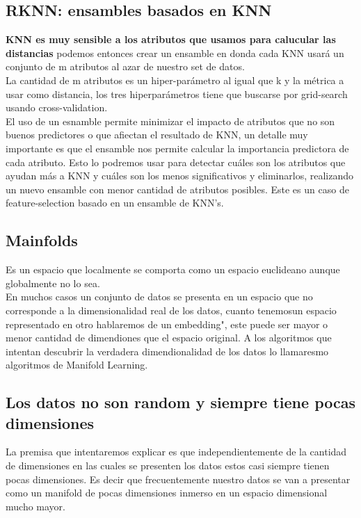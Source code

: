 \documentclass[titlepage,a4paper]{article}
\begin{document}
\subsection*{RKNN: ensambles basados en KNN}
\textbf{KNN es muy sensible a los atributos que usamos para calucular las distancias} podemos entonces crear un ensamble en donda cada KNN usará un conjunto de m atributos al azar de nuestro set de datos. \\
La cantidad de m atributos es un hiper-parámetro al igual que k y la métrica a usar como distancia, los tres hiperparámetros tiene que buscarse  por grid-search usando cross-validation. \\

El uso de un esnamble permite minimizar el impacto de atributos que no son buenos predictores o que afiectan el resultado de KNN, un detalle muy importante es que el ensamble nos permite calcular la importancia predictora de cada atributo. Esto lo podremos usar para detectar cuáles son los atributos que ayudan más a KNN y cuáles son los menos significativos y eliminarlos, realizando un nuevo ensamble con menor cantidad de atributos posibles. Este es un caso de feature-selection basado en un ensamble de KNN's. 

\subsection*{Mainfolds}
Es un espacio que localmente se comporta como un espacio euclideano aunque globalmente no lo sea. \\

En muchos casos un conjunto de datos se presenta en un espacio que no corresponde a la dimensionalidad real de los datos, cuanto tenemosun espacio representado en otro hablaremos de un embedding", este puede ser mayor o menor cantidad de dimendiones que el espacio original. A los algoritmos que intentan descubrir la verdadera dimendionalidad de los datos lo llamaresmo algoritmos de Manifold Learning. 

\subsection*{Los datos no son random y siempre tiene pocas dimensiones}
La premisa que intentaremos explicar es que independientemente de la cantidad de dimensiones en las cuales se presenten los datos estos casi siempre tienen pocas dimensiones. Es decir que frecuentemente nuestro datos se van a presentar como un manifold de pocas dimensiones inmerso en un espacio dimensional mucho mayor. \\
\end{document}
